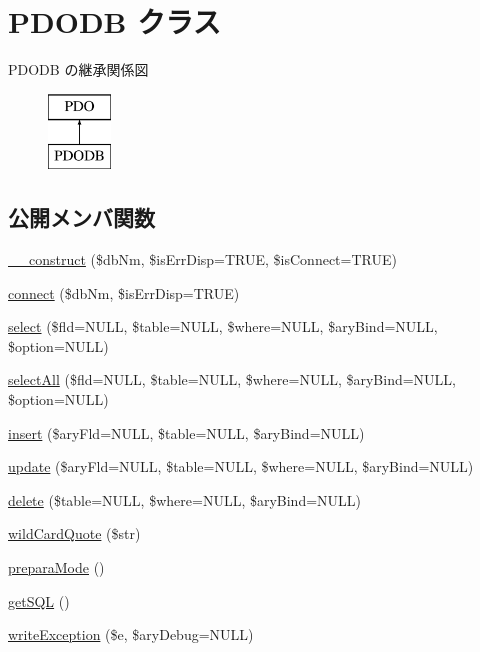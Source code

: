 \hypertarget{class_p_d_o_d_b}{\section{P\+D\+O\+D\+B クラス}
\label{class_p_d_o_d_b}
}
P\+D\+O\+D\+B の継承関係図\begin{figure}[H]
\begin{center}
\leavevmode
\includegraphics[height=2.000000cm]{class_p_d_o_d_b}
\end{center}
\end{figure}
\subsection*{公開メンバ関数}
\begin{DoxyCompactItemize}
\item 
\hyperlink{class_p_d_o_d_b_ab83ddb38397a6269ad9889763849375b}{\+\_\+\+\_\+construct} (\$db\+Nm, \$is\+Err\+Disp=T\+R\+U\+E, \$is\+Connect=T\+R\+U\+E)
\item 
\hyperlink{class_p_d_o_d_b_a659097eced6535d165a7a53e58965a32}{connect} (\$db\+Nm, \$is\+Err\+Disp=T\+R\+U\+E)
\item 
\hyperlink{class_p_d_o_d_b_a77a6eabc05971e2d9e2d27c834fa7fd7}{select} (\$fld=N\+U\+L\+L, \$table=N\+U\+L\+L, \$where=N\+U\+L\+L, \$ary\+Bind=N\+U\+L\+L, \$option=N\+U\+L\+L)
\item 
\hyperlink{class_p_d_o_d_b_a9afeeb57a89e5635a431de8e5b542064}{select\+All} (\$fld=N\+U\+L\+L, \$table=N\+U\+L\+L, \$where=N\+U\+L\+L, \$ary\+Bind=N\+U\+L\+L, \$option=N\+U\+L\+L)
\item 
\hyperlink{class_p_d_o_d_b_ac4ebdc9ea23cdaa05830bc1c24a49935}{insert} (\$ary\+Fld=N\+U\+L\+L, \$table=N\+U\+L\+L, \$ary\+Bind=N\+U\+L\+L)
\item 
\hyperlink{class_p_d_o_d_b_a179ba8695e7f6322edbdf57f6f5f6877}{update} (\$ary\+Fld=N\+U\+L\+L, \$table=N\+U\+L\+L, \$where=N\+U\+L\+L, \$ary\+Bind=N\+U\+L\+L)
\item 
\hyperlink{class_p_d_o_d_b_a86b899c21ecfb0135557d0222ac5dfa7}{delete} (\$table=N\+U\+L\+L, \$where=N\+U\+L\+L, \$ary\+Bind=N\+U\+L\+L)
\item 
\hyperlink{class_p_d_o_d_b_a0f84f6939001f98d3c4bffc48def826e}{wild\+Card\+Quote} (\$str)
\item 
\hyperlink{class_p_d_o_d_b_aa6d5dabec08e65836e680cc996882850}{prepara\+Mode} ()
\item 
\hyperlink{class_p_d_o_d_b_a67e8cb12dd05cee2a73454f8fa79efdc}{get\+S\+Q\+L} ()
\item 
\hyperlink{class_p_d_o_d_b_a9eb561b3798add7d463b192f8057fde7}{write\+Exception} (\$e, \$ary\+Debug=N\+U\+L\+L)
\end{DoxyCompactItemize}
